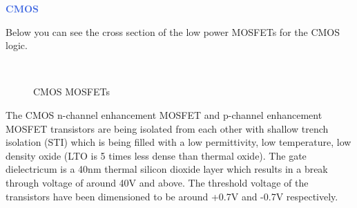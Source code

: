 \documentclass[10pt,a4paper]{article}
\renewcommand{\subsection}[1]{
	\vspace{5pt}
	\textcolor{RoyalBlue}{\textbf{\large{#1}}}
}
\begin{document}
\subsection{CMOS}

Below you can see the cross section of the low power MOSFETs for the CMOS logic.

\begin{figure}[H]
	\centering
	\begin{tikzpicture}[node distance = 3cm, auto, thick, scale=0.7, every node/.style={transform shape}]
		
	\end{tikzpicture}\\
	\caption{CMOS MOSFETs}
\end{figure}

The CMOS n-channel enhancement MOSFET and p-channel enhancement MOSFET transistors are being isolated from each
other with shallow trench isolation (STI) which is being filled with a low permittivity,
low temperature, low density oxide (LTO is 5 times less dense than thermal oxide).
The gate dielectricum is a 40nm thermal silicon dioxide layer which results in a break through voltage of around 40V and above.
The threshold voltage of the transistors have been dimensioned to be around +0.7V and -0.7V respectively.
\end{document}
